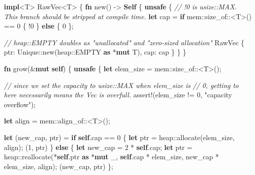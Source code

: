 \documentclass[a4paper,]{book}
\newenvironment{Shaded}{\begin{snugshade}}{\end{snugshade}}
\newcommand{\KeywordTok}[1]{\textcolor[rgb]{0.13,0.29,0.53}{\textbf{{#1}}}}
\newcommand{\DecValTok}[1]{\textcolor[rgb]{0.00,0.00,0.81}{{#1}}}
\newcommand{\StringTok}[1]{\textcolor[rgb]{0.31,0.60,0.02}{{#1}}}
\newcommand{\CommentTok}[1]{\textcolor[rgb]{0.56,0.35,0.01}{\textit{{#1}}}}
\newcommand{\OtherTok}[1]{\textcolor[rgb]{0.56,0.35,0.01}{{#1}}}
\newcommand{\NormalTok}[1]{{#1}}
\begin{document}
\begin{Shaded}
\begin{Highlighting}[]
\KeywordTok{impl}\NormalTok{<T> RawVec<T> \{}
    \KeywordTok{fn} \NormalTok{new() -> }\KeywordTok{Self} \NormalTok{\{}
        \KeywordTok{unsafe} \NormalTok{\{}
            \CommentTok{// !0 is usize::MAX. This branch should be stripped at compile time.}
            \KeywordTok{let} \NormalTok{cap = }\KeywordTok{if} \NormalTok{mem::size_of::<T>() == }\DecValTok{0} \NormalTok{\{ !}\DecValTok{0} \NormalTok{\} }\KeywordTok{else} \NormalTok{\{ }\DecValTok{0} \NormalTok{\};}

            \CommentTok{// heap::EMPTY doubles as "unallocated" and "zero-sized allocation"}
            \NormalTok{RawVec \{ ptr: Unique::new(heap::EMPTY }\KeywordTok{as} \NormalTok{*}\KeywordTok{mut} \NormalTok{T), cap: cap \}}
        \NormalTok{\}}
    \NormalTok{\}}

    \KeywordTok{fn} \NormalTok{grow(&}\KeywordTok{mut} \KeywordTok{self}\NormalTok{) \{}
        \KeywordTok{unsafe} \NormalTok{\{}
            \KeywordTok{let} \NormalTok{elem_size = mem::size_of::<T>();}

            \CommentTok{// since we set the capacity to usize::MAX when elem_size is}
            \CommentTok{// 0, getting to here necessarily means the Vec is overfull.}
            \OtherTok{assert!}\NormalTok{(elem_size != }\DecValTok{0}\NormalTok{, }\StringTok{"capacity overflow"}\NormalTok{);}

            \KeywordTok{let} \NormalTok{align = mem::align_of::<T>();}

            \KeywordTok{let} \NormalTok{(new_cap, ptr) = }\KeywordTok{if} \KeywordTok{self}\NormalTok{.cap == }\DecValTok{0} \NormalTok{\{}
                \KeywordTok{let} \NormalTok{ptr = heap::allocate(elem_size, align);}
                \NormalTok{(}\DecValTok{1}\NormalTok{, ptr)}
            \NormalTok{\} }\KeywordTok{else} \NormalTok{\{}
                \KeywordTok{let} \NormalTok{new_cap = }\DecValTok{2} \NormalTok{* }\KeywordTok{self}\NormalTok{.cap;}
                \KeywordTok{let} \NormalTok{ptr = heap::reallocate(*}\KeywordTok{self}\NormalTok{.ptr }\KeywordTok{as} \NormalTok{*}\KeywordTok{mut} \NormalTok{_,}
                                            \KeywordTok{self}\NormalTok{.cap * elem_size,}
                                            \NormalTok{new_cap * elem_size,}
                                            \NormalTok{align);}
                \NormalTok{(new_cap, ptr)}
            \NormalTok{\};}


\end{Highlighting}
\end{Shaded}
\end{document}
